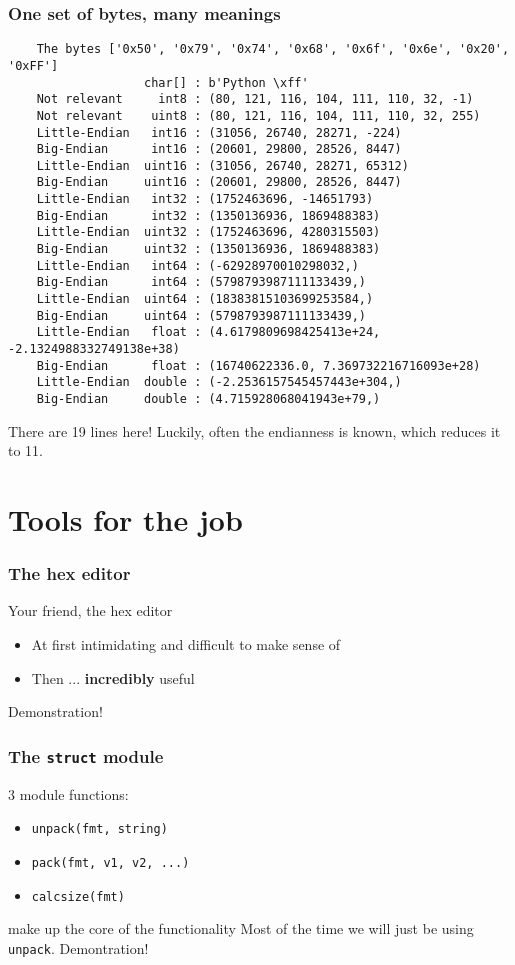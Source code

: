 \documentclass{beamer}
\begin{document}
\begin{frame}[fragile]
  \frametitle{One set of bytes, many meanings}
  \scriptsize
  \begin{verbatim}
    The bytes ['0x50', '0x79', '0x74', '0x68', '0x6f', '0x6e', '0x20', '0xFF']
                   char[] : b'Python \xff'
    Not relevant     int8 : (80, 121, 116, 104, 111, 110, 32, -1)
    Not relevant    uint8 : (80, 121, 116, 104, 111, 110, 32, 255)
    Little-Endian   int16 : (31056, 26740, 28271, -224)
    Big-Endian      int16 : (20601, 29800, 28526, 8447)
    Little-Endian  uint16 : (31056, 26740, 28271, 65312)
    Big-Endian     uint16 : (20601, 29800, 28526, 8447)
    Little-Endian   int32 : (1752463696, -14651793)
    Big-Endian      int32 : (1350136936, 1869488383)
    Little-Endian  uint32 : (1752463696, 4280315503)
    Big-Endian     uint32 : (1350136936, 1869488383)
    Little-Endian   int64 : (-62928970010298032,)
    Big-Endian      int64 : (5798793987111133439,)
    Little-Endian  uint64 : (18383815103699253584,)
    Big-Endian     uint64 : (5798793987111133439,)
    Little-Endian   float : (4.6179809698425413e+24, -2.1324988332749138e+38)
    Big-Endian      float : (16740622336.0, 7.369732216716093e+28)
    Little-Endian  double : (-2.2536157545457443e+304,)
    Big-Endian     double : (4.715928068041943e+79,)
  \end{verbatim}
  \normalsize
  There are 19 lines here! Luckily, often the endianness is known, which reduces it to 11.
\end{frame}

\section{Tools for the job}
\begin{frame}
  \frametitle{The hex editor}
  \begin{block}{Your friend, the hex editor}
    \begin{itemize}
    \item At first intimidating and difficult to make sense of
    \item Then ... \textbf{incredibly} useful
    \end{itemize}  
  \end{block}
  \huge
  \vspace{2cm}
  Demonstration!
\end{frame}

\begin{frame}
  \frametitle{The \texttt{struct} module}
  3 module functions:\newline
  \begin{itemize}
  \item \texttt{unpack(fmt, string)}
  \item \texttt{pack(fmt, v1, v2, ...)}
  \item \texttt{calcsize(fmt)}
  \end{itemize}
  make up the core of the functionality\newline
  \newline
  Most of the time we will just be using \texttt{unpack}.
  \huge
  Demontration!
\end{frame}
\end{document}
